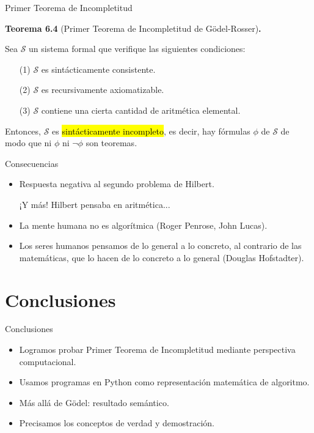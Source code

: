 \documentclass[10pt,xcolor=dvipsnames,aspectratio=169,spanish]{beamer}
\makeatletter
\let\HL\hl
\renewcommand\hl{%
  \let\set@color\beamerorig@set@color
  \let\reset@color\beamerorig@reset@color
  \HL}
\makeatother
\begin{document}
\begin{frame}{Primer Teorema de Incompletitud}

\textbf{Teorema 6.4} (Primer Teorema de Incompletitud de Gödel-Rosser)\textbf{.}

Sea $\mathcal{S}$ un sistema formal que verifique las siguientes condiciones:
\begin{itemize}
    \item[(1)] $\mathcal{S}$ es sintácticamente consistente.
    \item[(2)] $\mathcal{S}$ es recursivamente axiomatizable.
    \item[(3)] $\mathcal{S}$ contiene una cierta cantidad de aritmética elemental.
\end{itemize}

Entonces, $\mathcal{S}$ es \hl{sintácticamente incompleto}, es decir, hay fórmulas $\phi$ de $\mathcal{S}$ de modo que ni $\phi$ ni $\neg\phi$ son teoremas.
\end{frame}


\begin{frame}{Consecuencias}

\begin{itemize}
    \item Respuesta negativa al segundo problema de Hilbert.

    ¡Y más! Hilbert pensaba en aritmética...
    \vspace{5mm}
    \pause
    \item La mente humana no es algorítmica (Roger Penrose, John Lucas).
    \item Los seres humanos pensamos de lo general a lo concreto, al contrario de las matemáticas, que lo hacen de lo concreto a lo general (Douglas Hofstadter).
\end{itemize}

\end{frame}

\section{Conclusiones}

\begin{frame}{Conclusiones}

\begin{itemize}
    \item Logramos probar Primer Teorema de Incompletitud mediante perspectiva computacional.
    \item Usamos programas en Python como representación matemática de algoritmo.
    \item Más allá de Gödel: resultado semántico.
    \item Precisamos los conceptos de verdad y demostración.
\end{itemize}

\end{frame}

\maketitle
\end{document}
